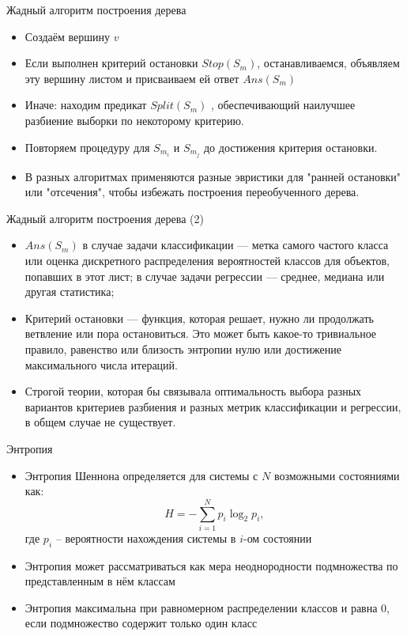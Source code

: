 \documentclass{beamer}
\begin{document}
\begin{frame}{Жадный алгоритм построения дерева}
    \small
    \begin{itemize}
        \item Создаём вершину $v$
        \item Если выполнен критерий остановки $Stop(S_m)$, останавливаемся, объявляем эту вершину листом и присваиваем ей ответ $Ans(S_m)$
        \item Иначе: находим предикат $Split(S_m)$ , обеспечивающий наилучшее разбиение выборки по некоторому критерию.
        \item Повторяем процедуру для $S_{m_i}$ и $S_{m_j}$ до достижения критерия остановки.
        \item В разных алгоритмах применяются разные эвристики для "ранней остановки" или "отсечения", чтобы избежать построения переобученного дерева.
    \end{itemize}
\end{frame}

\begin{frame}{Жадный алгоритм построения дерева (2) }
    \small

    \begin{itemize}
        \item  $Ans(S_m)$ в случае задачи классификации — метка самого частого класса или оценка дискретного распределения вероятностей классов для объектов, попавших в этот лист; в случае задачи регрессии — среднее, медиана или другая статистика;
        \item Критерий остановки  — функция, которая решает, нужно ли продолжать ветвление или пора остановиться. Это может быть какое-то тривиальное правило, равенство или близость энтропии нулю или достижение максимального числа итераций.
        \item Строгой теории, которая бы связывала оптимальность выбора разных вариантов критериев разбиения и разных метрик классификации и регрессии, в общем случае не существует.
    \end{itemize}
\end{frame}

\begin{frame}{Энтропия}
    \small

    \begin{itemize}
        \item Энтропия Шеннона определяется для системы с $N$ возможными состояниями как:
        \begin{equation}
          H = - \sum_{i=1}^N p_i \log_2 {p_i},
        \end{equation}
        где $p_i$ – вероятности нахождения системы в $i$-ом состоянии
        \item Энтропия может рассматриваться как мера неоднородности подмножества по представленным в нём классам
        \item Энтропия максимальна при равномерном распределении классов и равна 0, если подмножество содержит только один класс
    \end{itemize}
\end{frame}
\end{document}
